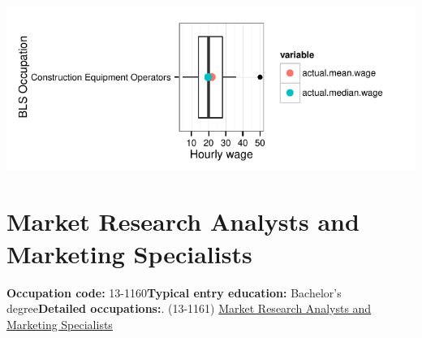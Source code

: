 \documentclass[a4paper,10pt]{article}\usepackage[]{graphicx}\usepackage[]{color}
\makeatletter
\def\maxwidth{ %
  \ifdim\Gin@nat@width>\linewidth
    \linewidth
  \else
    \Gin@nat@width
  \fi
}
\makeatother
\begin{document}
{\centering \includegraphics[width=\maxwidth]{figure/unnamed-chunk-284} 

}


\newpage\section{Market Research Analysts and Marketing Specialists}\textbf{Occupation code:} 13-1160\newline\textbf{Typical entry education:} Bachelor's degree\newline\textbf{Detailed occupations:}. (13-1161)  \href{http://www.bls.gov/oes/current/oes131161.htm}{Market Research Analysts and Marketing Specialists}\newline%
\end{document}
